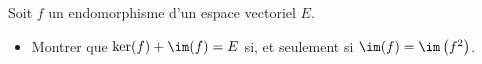 \begin{enonce}
\begin{exercise}[ID={RMS133 E1406},subtitle={CCINP PC 2022},tags={},difficulty={}]
Soit $f$ un endomorphisme d'un espace vectoriel $E$.
\begin{itemize}
  \item Montrer que $\ker(f)+\im(f)=E$ si, et seulement si $\im(f) = \im\left( f^2 \right)$.
\end{itemize}
\end{exercise}
\begin{solution}
\end{solution}
\end{enonce}
